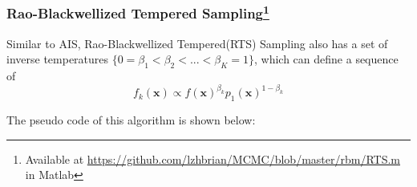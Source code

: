 
\subsubsection{Rao-Blackwellized Tempered Sampling\protect\footnote{Available at \protect\url{https://github.com/lzhbrian/MCMC/blob/master/rbm/RTS.m} in Matlab}}

Similar to AIS, Rao-Blackwellized Tempered(RTS)\cite{carlson2016partition} Sampling also has a set of inverse temperatures $\{0= \beta_{1} < \beta_{2} < ... < \beta_{K} =1\}$, which can define a sequence of
\begin{equation}
f_{k}(\mathbf x) \propto f(\mathbf x)^{\beta_{k}} p_{1}(\mathbf x)^{1-\beta_{k}}
\end{equation}




The pseudo code of this algorithm is shown below: